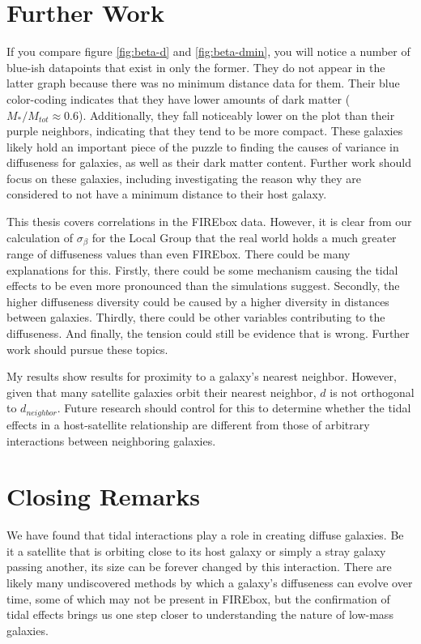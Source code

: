 \section{Further Work}

If you compare figure \ref{fig:beta-d} and \ref{fig:beta-dmin}, you will notice a number of blue-ish datapoints that exist in only the former. They do not appear in the latter graph because there was no minimum distance data for them. Their blue color-coding indicates that they have lower amounts of dark matter ($M_{*} / M_{tot} \approx 0.6$). Additionally, they fall noticeably lower on the plot than their purple neighbors, indicating that they tend to be more compact. These galaxies likely hold an important piece of the puzzle to finding the causes of variance in diffuseness for galaxies, as well as their dark matter content. Further work should focus on these galaxies, including investigating the reason why they are considered to not have a minimum distance to their host galaxy. 

This thesis covers correlations in the FIREbox data. However, it is clear from our calculation of $\sigma_\beta$ for the Local Group that the real world holds a much greater range of diffuseness values than even FIREbox. There could be many explanations for this. Firstly, there could be some mechanism causing the tidal effects to be even more pronounced than the simulations suggest. Secondly, the higher diffuseness diversity could be caused by a higher diversity in distances between galaxies. Thirdly, there could be other variables contributing to the diffuseness. And finally, the tension could still be evidence that \lcdm\* is wrong. Further work should pursue these topics.

My results show results for proximity to a galaxy's nearest neighbor. However, given that many satellite galaxies orbit their nearest neighbor, $d$ is not orthogonal to $d_{neighbor}$. Future research should control for this to determine whether the tidal effects in a host-satellite relationship are different from those of arbitrary interactions between neighboring galaxies.

\section{Closing Remarks}

We have found that tidal interactions play a role in creating diffuse galaxies. Be it a satellite that is orbiting close to its host galaxy or simply a stray galaxy passing another, its size can be forever changed by this interaction. There are likely many undiscovered methods by which a galaxy's diffuseness can evolve over time, some of which may not be present in FIREbox, but the confirmation of tidal effects brings us one step closer to understanding the nature of low-mass galaxies.